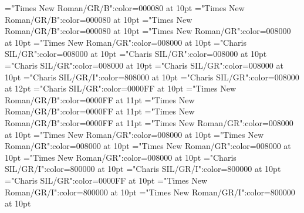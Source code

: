 \documentclass[a4paper,twoside]{article}
\begin{document}
\font\spanmxbspanspanspansensespanspanentryletDatadicBody="Times New Roman/GR/B":color=000080 at 10pt
\font\spanexampleexamplescontentssensesensecontentsensesentryspanmxbspanspanspansensespanspanentryletDatadicBody="Times New Roman/GR/B":color=000080 at 10pt
\font\spanexampleexamplescontentssensesensecontentsensesentryspanspanspansensespanspanentryletDatadicBody="Times New Roman/GR/B":color=000080 at 10pt
\font\spanspanspanspansensespanspanentryletDatadicBody="Times New Roman/GR":color=008000 at 10pt
\font\spanspanspanspanspansensespanspanentryletDatadicBody="Times New Roman/GR":color=008000 at 10pt
\font\spanesspanspanspanspanspansensespanspanentryletDatadicBody="Charis SIL/GR":color=008000 at 10pt
\font\spanspanesspanspanspanspanspansensespanspanentryletDatadicBody="Charis SIL/GR":color=008000 at 10pt
\font\spanspanspanspanspanspansensespanspanentryletDatadicBody="Charis SIL/GR":color=008000 at 10pt
\font\spanesspanesspanspanspanspanspansensespanspanentryletDatadicBody="Charis SIL/GR":color=008000 at 10pt
\font\translationstesspanesspanspanspanspanspansensespanspanentryletDatadicBody="Charis SIL/GR/I":color=808000 at 10pt
\font\minorentryvariantletDatadicBody="Charis SIL/GR":color=008000 at 12pt
\font\headwordminorentryvariantletDatadicBody="Charis SIL/GR":color=0000FF at 10pt
\font\spanmxbheadwordminorentryvariantletDatadicBody="Times New Roman/GR/B":color=0000FF at 11pt
\font\aspanmxbheadwordminorentryvariantletDatadicBody="Times New Roman/GR/B":color=0000FF at 11pt
\font\spanheadwordminorentryvariantheadwordminorentryvariantletDatadicBody="Times New Roman/GR/B":color=0000FF at 11pt
\font\spanminorentryvariantletDatadicBody="Times New Roman/GR":color=008000 at 10pt
\font\spanspanminorentryvariantletDatadicBody="Times New Roman/GR":color=008000 at 10pt
\font\spanspanspanminorentryvariantletDatadicBody="Times New Roman/GR":color=008000 at 10pt
\font\spanspanspanspanminorentryvariantletDatadicBody="Times New Roman/GR":color=008000 at 10pt
\font\spanspanspanspanspanminorentryvariantletDatadicBody="Times New Roman/GR":color=008000 at 10pt
\font\spanesspanspanspanspanspanminorentryvariantletDatadicBody="Charis SIL/GR/I":color=800000 at 10pt
\font\spanreverseabbrvariantentrytypesvisiblevariantentryrefsminorentryvariantspanspanspanspanspanminorentryvariantletDatadicBody="Charis SIL/GR/I":color=800000 at 10pt
\font\headwordspanspanspanspanminorentryvariantletDatadicBody="Charis SIL/GR":color=0000FF at 10pt
\font\spanmxbheadwordspanspanspanspanminorentryvariantletDatadicBody="Times New Roman/GR/I":color=800000 at 10pt
\font\spanheadwordreferencedentryreferencedentriesvisiblevariantentryrefsminorentryvariantspanmxbheadwordspanspanspanspanminorentryvariantletDatadicBody="Times New Roman/GR/I":color=800000 at 10pt
\end{document}
